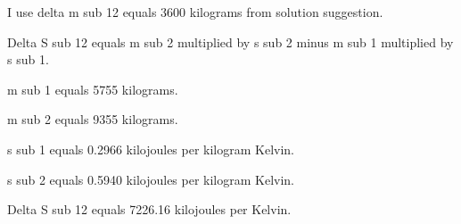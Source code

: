 I use delta m sub 12 equals 3600 kilograms from solution suggestion.  

Delta S sub 12 equals m sub 2 multiplied by s sub 2 minus m sub 1 multiplied by s sub 1.  

m sub 1 equals 5755 kilograms.  

m sub 2 equals 9355 kilograms.  

s sub 1 equals 0.2966 kilojoules per kilogram Kelvin.  

s sub 2 equals 0.5940 kilojoules per kilogram Kelvin.  

Delta S sub 12 equals 7226.16 kilojoules per Kelvin.
